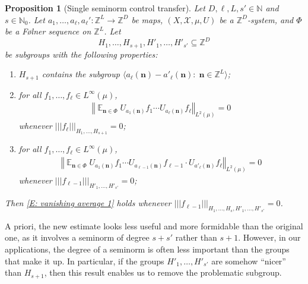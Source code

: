 \documentclass[11pt]{amsart}
\newtheorem{proposition}[lemma]{Proposition}
\theoremstyle{definition}
\DeclareMathOperator*{\E}{\mathbb{E}}
\newcommand{\N}{{\mathbb N}}
\newcommand{\Z}{{\mathbb Z}}
\newcommand{\CX}{{\mathcal X}}
\newcommand{\bn}{{\mathbf{n}}}
\newcommand{\norm}[1]{\left\Vert #1\right\Vert}
\newcommand{\nnorm}[1]{\lvert\!|\!| #1|\!|\!\rvert}
\newcommand{\1}{{\mathbf{1}}}
\begin{document}
\begin{proposition}[Single seminorm control transfer]\label{P: seminorm transfer}
    Let $D,\ell,L,s'\in\N$ and $s\in\N_0$. Let $a_1, \ldots, a_\ell, a_\ell':\Z^L\to\Z^D$ be maps, $(X, \CX, \mu, U)$ be a $\Z^D$-system, and $\Phi$ be a F{\o}lner sequence on $\Z^L$. Let $$H_1, \ldots, H_{s+1}, H'_1, \ldots, H'_{s'}\subseteq \Z^D$$ be subgroups with the following properties:
    \begin{enumerate}
        \item $H_{s+1}$ contains the subgroup $\langle a_\ell(\bn)-a'_\ell(\bn)\colon\; \bn\in\Z^L\rangle$;
        \item for all $f_1, \ldots, f_\ell\in L^\infty(\mu)$,
        \begin{align}\label{E: vanishing average 1}
            \norm{\E_{\bn\in\Phi}U_{a_1(\bn)}f_1\cdots U_{a_\ell(\bn)}f_\ell}_{L^2(\mu)} = 0
        \end{align}
        whenever $\nnorm{f_\ell}_{H_1, \ldots, H_{s+1}} = 0$;
        \item for all $f_1, \ldots, f_{\ell}\in L^\infty(\mu)$,
        \begin{align}\label{E: vanishing average 1.1}
            \norm{\E_{\bn\in\Phi}U_{a_1(\bn)}f_1\cdots U_{a_{\ell-1}(\bn)}f_{\ell-1}\cdot U_{a'_\ell(\bn)}f_\ell}_{L^2(\mu)} = 0
        \end{align}
        whenever $\nnorm{f_{\ell-1}}_{H'_1, \ldots, H'_{s'}} = 0$;
    \end{enumerate}
     Then \eqref{E: vanishing average 1} holds whenever $\nnorm{f_{\ell-1}}_{H_1, \ldots, H_{s}, H'_1, \ldots, H'_{s'}} = 0$.
\end{proposition}
A priori, the new estimate looks less useful and more formidable than the original one, as it involves a seminorm of degree $s+s'$ rather than $s+1$. However, in our applications, the degree of a seminorm is often less important than the groups that make it up. In particular, if the groups $H'_1, \ldots, H'_{s'}$ are somehow ``nicer'' than $H_{s+1}$, then this result enables us to remove the problematic subgroup.
\end{document}
